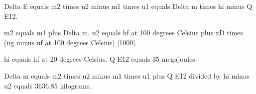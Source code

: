 Delta E equals m2 times u2 minus m1 times u1 equals Delta m times hi minus Q E12.  

m2 equals m1 plus Delta m.  
u2 equals hf at 100 degrees Celsius plus xD times (ug minus uf at 100 degrees Celsius) [1000].  

hi equals hf at 20 degrees Celsius.  
Q E12 equals 35 megajoules.  

Delta m equals m2 times u2 minus m1 times u1 plus Q E12 divided by hi minus u2 equals 3636.85 kilograms.